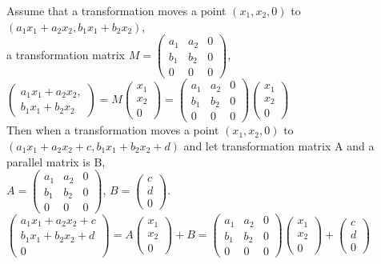 \documentclass[11pt, oneside]{jsarticle} 	%
\begin{document}
Assume that a transformation moves a point $(x_1,x_2,0)$ to $(a_1x_1 + a_2x_2,b_1x_1+b_2x_2)$,\\
a transformation matrix 
$ M=
\begin{pmatrix}
 a_1 & a_2 & 0\\
 b_1 & b_2 & 0\\
 0 & 0 & 0
\end{pmatrix}$,\\
$\begin{pmatrix}
 a_1x_1 + a_2x_2,\\
 b_1x_1+b_2x_2
\end{pmatrix}=M\begin{pmatrix}
 x_1\\
 x_2\\
 0
\end{pmatrix}=\begin{pmatrix}
 a_1 & a_2 & 0\\
 b_1 & b_2 & 0\\
 0 & 0 & 0
\end{pmatrix}\begin{pmatrix}
 x_1\\
 x_2\\
 0
\end{pmatrix}$\\
Then when a transformation moves a point $(x_1,x_2,0)$ to $(a_1x_1 + a_2x_2+c,b_1x_1+b_2x_2+d)$ and let transformation matrix A and a parallel matrix is B, \\
$A=\begin{pmatrix}
 a_1 & a_2 & 0\\
 b_1 & b_2 & 0\\
 0 & 0 & 0
\end{pmatrix}$, $B=\begin{pmatrix}
 c\\
 d\\
 0
 \end{pmatrix}$.\\
 $\begin{pmatrix}
 a_1x_1 + a_2x_2+c\\
 b_1x_1+b_2x_2+d\\
 0 
 \end{pmatrix}=A\begin{pmatrix}
 x_1\\
 x_2\\
 0
\end{pmatrix}+B=\begin{pmatrix}
 a_1 & a_2 & 0\\
 b_1 & b_2 & 0\\
 0 & 0 & 0
\end{pmatrix}\begin{pmatrix}
 x_1\\
 x_2\\
 0
\end{pmatrix}+\begin{pmatrix}
 c\\
 d\\
 0
 \end{pmatrix}$
 
\end{document}
